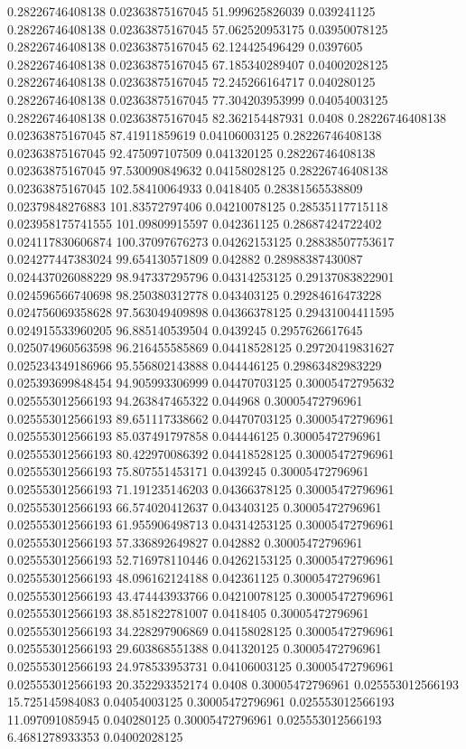 0.28226746408138 0.02363875167045 51.999625826039 0.039241125
0.28226746408138 0.02363875167045 57.062520953175 0.03950078125
0.28226746408138 0.02363875167045 62.124425496429 0.0397605
0.28226746408138 0.02363875167045 67.185340289407 0.04002028125
0.28226746408138 0.02363875167045 72.245266164717 0.040280125
0.28226746408138 0.02363875167045 77.304203953999 0.04054003125
0.28226746408138 0.02363875167045 82.362154487931 0.0408
0.28226746408138 0.02363875167045 87.41911859619 0.04106003125
0.28226746408138 0.02363875167045 92.475097107509 0.041320125
0.28226746408138 0.02363875167045 97.530090849632 0.04158028125
0.28226746408138 0.02363875167045 102.58410064933 0.0418405
0.28381565538809 0.02379848276883 101.83572797406 0.04210078125
0.28535117715118 0.023958175741555 101.09809915597 0.042361125
0.28687424722402 0.024117830606874 100.37097676273 0.04262153125
0.28838507753617 0.024277447383024 99.654130571809 0.042882
0.28988387430087 0.024437026088229 98.947337295796 0.04314253125
0.29137083822901 0.024596566740698 98.250380312778 0.043403125
0.29284616473228 0.024756069358628 97.563049409898 0.04366378125
0.29431004411595 0.024915533960205 96.885140539504 0.0439245
0.2957626617645 0.025074960563598 96.216455585869 0.04418528125
0.29720419831627 0.025234349186966 95.556802143888 0.044446125
0.29863482983229 0.025393699848454 94.905993306999 0.04470703125
0.30005472795632 0.025553012566193 94.263847465322 0.044968
0.30005472796961 0.025553012566193 89.651117338662 0.04470703125
0.30005472796961 0.025553012566193 85.037491797858 0.044446125
0.30005472796961 0.025553012566193 80.422970086392 0.04418528125
0.30005472796961 0.025553012566193 75.807551453171 0.0439245
0.30005472796961 0.025553012566193 71.191235146203 0.04366378125
0.30005472796961 0.025553012566193 66.574020412637 0.043403125
0.30005472796961 0.025553012566193 61.955906498713 0.04314253125
0.30005472796961 0.025553012566193 57.336892649827 0.042882
0.30005472796961 0.025553012566193 52.716978110446 0.04262153125
0.30005472796961 0.025553012566193 48.096162124188 0.042361125
0.30005472796961 0.025553012566193 43.474443933766 0.04210078125
0.30005472796961 0.025553012566193 38.851822781007 0.0418405
0.30005472796961 0.025553012566193 34.228297906869 0.04158028125
0.30005472796961 0.025553012566193 29.603868551388 0.041320125
0.30005472796961 0.025553012566193 24.978533953731 0.04106003125
0.30005472796961 0.025553012566193 20.352293352174 0.0408
0.30005472796961 0.025553012566193 15.725145984083 0.04054003125
0.30005472796961 0.025553012566193 11.097091085945 0.040280125
0.30005472796961 0.025553012566193 6.4681278933353 0.04002028125
